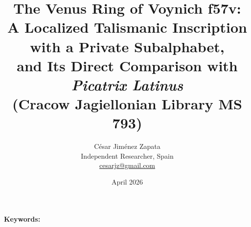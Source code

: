 \documentclass[11pt,a4paper]{article}
\begin{document}
\title{The Venus Ring of Voynich f57v:\\
A Localized Talismanic Inscription with a Private Subalphabet,\\
and Its Direct Comparison with \textit{Picatrix Latinus}\\
(Cracow Jagiellonian Library MS 793)}

\author{C\'esar Jim\'enez Zapata\\
\small Independent Researcher, Spain\\
\small \href{mailto:cesarjz@gmail.com}{cesarjz@gmail.com}}

\date{April 2026}

\maketitle

\begin{abstract}

\end{abstract}

\noindent\textbf{Keywords:} 





\end{document}
